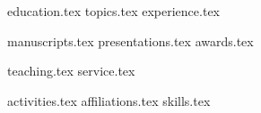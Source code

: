 \documentclass[letterpaper,11pt]{article}
\begin{document}


{education.tex}
{topics.tex}
{experience.tex}


\pagebreak
{manuscripts.tex}
{presentations.tex}
{awards.tex}


{teaching.tex}
{service.tex}


{activities.tex}
{affiliations.tex}
{skills.tex}


\pagebreak
\end{document}
